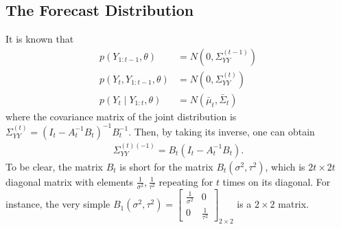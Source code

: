\subsection{The Forecast Distribution}

It is known that 
\begin{align}
p(Y_{1:t-1},\theta) &= N\left( 0,\Sigma_{YY}^{(t-1)} \right)\\
p(Y_{t},Y_{1:t-1},\theta) &= N\left( 0,\Sigma_{YY}^{(t)} \right)\\
p(Y_{t}\mid Y_{1:t},\theta) &= N\left( \bar{\mu}_{t},\bar{\Sigma}_{t} \right)
\end{align}
where the covariance matrix of the joint distribution is $\Sigma_{YY}^{(t)} = \left(I_{t}-A_{t}^{-1}B_{t}\right)^{-1}B_{t}^{-1}$. Then, by taking its inverse, one can obtain 
\begin{align}
\Sigma_{YY}^{(t) (-1)} = B_{t}(I_{t}-A_{t}^{-1}B_{t}).
\end{align}
To be clear, the matrix $B_{t}$ is short for the matrix $B_{t}(\sigma^2,\tau^2)$, which is $2t\times 2t$ diagonal matrix with elements $\frac{1}{\sigma^2},\frac{1}{\tau^2}$ repeating for $t$ times on its diagonal. For instance, the very simple $B_1(\sigma^2,\tau^2) = 
\begin{bmatrix}
\frac{1}{\sigma^2} & 0  \\
0 & \frac{1}{\tau^2}
\end{bmatrix}_{2\times 2}$ is a $2\times 2$ matrix. 

